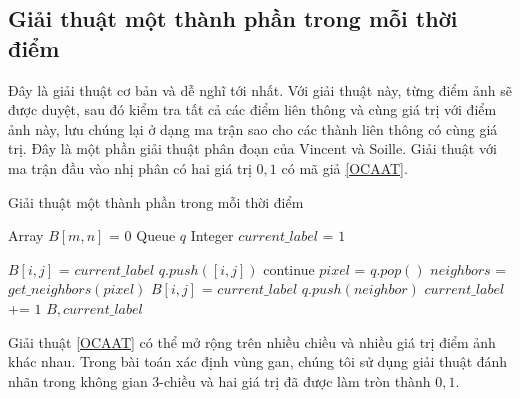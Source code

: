 \subsection{Giải thuật một thành phần trong mỗi thời điểm}
Đây là giải thuật cơ bản và dễ nghĩ tới nhất. Với giải thuật này, từng điểm ảnh sẽ được duyệt, sau đó kiểm tra tất cả các điểm liên thông và cùng giá trị với điểm ảnh này, lưu chúng lại ở dạng ma trận sao cho các thành liên thông có cùng giá trị. Đây là một phần giải thuật phân đoạn của Vincent và Soille\cite{87344}. Giải thuật với ma trận đầu vào nhị phân có hai giá trị $0, 1$ có mã giả \ref{OCAAT}.\\
\begin{algorithm}
  \caption{Giải thuật một thành phần trong mỗi thời điểm}\label{OCAAT}
  \begin{algorithmic}[1]
    \State Array $B[m, n]$ = $0$ 
    \State Queue $q$ 
    \State Integer $current\_label$ = $1$
    
             
                \State $B[i,j]$ = $current\_label$ 
                \State $q.push([i,j])$
            \Else
                \State continue
            \EndIf
                \State $pixel$ = $q.pop()$
                \State $neighbors$ = $get\_neighbors(pixel)$
                        \State $B[i,j]$ = $current\_label$
                        \State $q.push(neighbor)$
                    \EndIf
                \EndFor
            \EndWhile
            \State $current\_label$ += $1$
        \EndFor   
    \EndFor
    \Return $B, current\_label$
    \EndProcedure
  \end{algorithmic}
\end{algorithm}
Giải thuật \ref{OCAAT} có thể mở rộng trên nhiều chiều và nhiều giá trị điểm ảnh khác nhau. Trong bài toán xác định vùng gan, chúng tôi sử dụng giải thuật đánh nhãn trong không gian 3-chiều và hai giá trị đã được làm tròn thành $0,1$.

